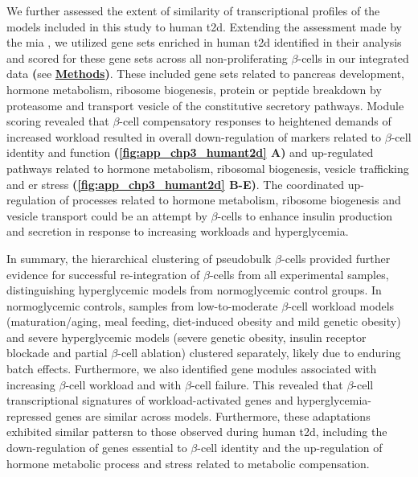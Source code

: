\par We further assessed the extent of similarity of transcriptional profiles of the models included in this study to human \gls{t2d}. Extending the assessment made by the \gls{mia} \textbf{\cite{hrovatin_delineating_2023}}, we utilized gene sets enriched in human \gls{t2d} identified in their analysis and scored for these gene sets across all non-proliferating $\beta$-cells in our integrated data \textbf{(}see \hyperref[subsubsec:met_chp3_scoring]{\textbf{Methods}}\textbf{)}. These included gene sets related to pancreas development, hormone metabolism, ribosome biogenesis, protein or peptide breakdown by proteasome and transport vesicle of the constitutive secretory pathways. Module scoring revealed that $\beta$-cell compensatory responses to heightened demands of increased workload resulted in overall down-regulation of markers related to $\beta$-cell identity and function \textbf{(\autoref{fig:app_chp3_humant2d} A)} and up-regulated pathways related to hormone metabolism, ribosomal biogenesis, vesicle trafficking and \gls{er} stress \textbf{(\autoref{fig:app_chp3_humant2d} B-E)}. The coordinated up-regulation of processes related to hormone metabolism, ribosome biogenesis and vesicle transport could be an attempt by $\beta$-cells to enhance insulin production and secretion in response to increasing workloads and hyperglycemia.\\


\par In summary, the hierarchical clustering of pseudobulk $\beta$-cells provided further evidence for successful re-integration of $\beta$-cells from all experimental samples, distinguishing hyperglycemic models from normoglycemic control groups. In normoglycemic controls, samples from low-to-moderate $\beta$-cell workload models (maturation/aging, meal feeding, diet-induced obesity and mild genetic obesity) and severe hyperglycemic models (severe genetic obesity, insulin receptor blockade and partial $\beta$-cell ablation) clustered separately, likely due to enduring batch effects. Furthermore, we also identified gene modules associated with increasing $\beta$-cell workload and with $\beta$-cell failure. This revealed that $\beta$-cell transcriptional signatures of workload-activated genes and hyperglycemia-repressed genes are similar across models. Furthermore, these adaptations exhibited similar pattersn to those observed during human \gls{t2d}, including the down-regulation of genes essential to $\beta$-cell identity and the up-regulation of hormone metabolic process and stress related to metabolic compensation.

